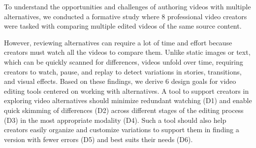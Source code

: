To understand the opportunities and challenges of authoring videos with multiple alternatives, we conducted a formative study where 8 professional video creators were tasked with comparing multiple edited videos of the same source content. 


However, reviewing alternatives can require a lot of time and effort because creators must watch all the videos to compare them. Unlike static images or text, which can be quickly scanned for differences, videos unfold over time, requiring creators to watch, pause, and replay to detect variations in stories, transitions, and visual effects. Based on these findings, we derive 6 design goals for video editing tools centered on working with alternatives. 
A tool to support creators in exploring video alternatives should minimize redundant watching (D1) and enable quick skimming of differences (D2) across different stages of the editing process (D3) in the most appropriate modality (D4). Such a tool should also help creators easily organize and customize variations to support them in finding a version with fewer errors (D5) and best suits their needs (D6). 





